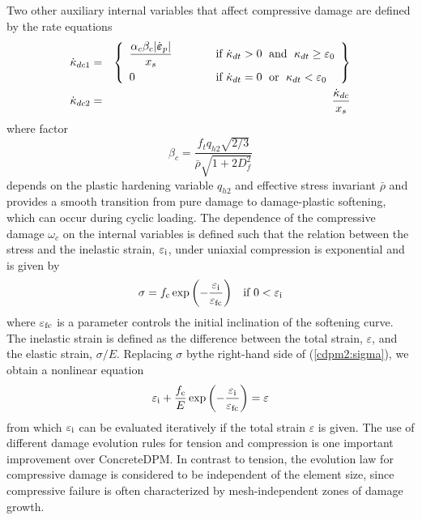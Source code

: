 \documentclass[a4paper]{article}
\begin{document}
Two other auxiliary internal variables that affect compressive damage are defined by the rate equations
\begin{eqnarray}
\dot\kappa_{dc1} &=& \left\{\begin{array}{ll}
\displaystyle\frac{\alpha_c\beta_c\vert\dot{\boldsymbol\varepsilon}_p\vert}{x_s} & \hskip 10mm \mbox{if } \dot\kappa_{dt}>0\;\mbox{ and }\; \kappa_{dt}\ge \varepsilon_0
\\[3mm]
0 & \hskip 10mm \mbox{if } \dot\kappa_{dt}=0\;\mbox{ or }\; \kappa_{dt}< \varepsilon_0
\end{array}\right\}
\\
\dot\kappa_{dc2} &=&  \frac{\dot\kappa_{dc}}{x_s}
\end{eqnarray}
where factor
\begin{equation}\label{cdpm2:betac}
  \beta_c =\frac{f_tq_{h2}\sqrt{2/3}}{\bar\rho\sqrt{1+2D_f^2}}
\end{equation}
depends on the plastic hardening variable $q_{h2}$ and
effective stress invariant $\bar\rho$ and provides a smooth transition 
from pure damage to damage-plastic softening, which can occur during cyclic
loading. The dependence of the compressive damage $\omega_c$ on the internal
variables is defined such that the relation between the stress and the inelastic strain, $\varepsilon_{\rm i}$,
under uniaxial compression is exponential and is given by
\begin{equation}\label{cdpm2:sigma}
\begin{array}{ll}
\sigma = f_{\rm c} \exp\left(-\dfrac{\varepsilon_{\rm i}}{\varepsilon_{\rm fc}}\right) & \mbox{if $0 < \varepsilon_{\rm i}$}
\end{array}
\end{equation}
where $\varepsilon_{\rm fc}$ is a parameter controls the initial inclination of the softening curve.
The inelastic strain is defined as the difference between the total strain, $\varepsilon$, and the elastic strain, $\sigma/E$.
Replacing $\sigma$ bythe right-hand side of (\ref{cdpm2:sigma}), we obtain a nonlinear equation
\begin{equation}\label{cdpm2:epsi}
\begin{array}{ll}
\varepsilon_{\rm i} + \dfrac{f_{\rm c}}{E} \exp\left(-\dfrac{\varepsilon_{\rm i}}{\varepsilon_{\rm fc}}\right) = \varepsilon
\end{array}
\end{equation}
from which $\varepsilon_{\rm i}$ can be evaluated iteratively if the total strain $\varepsilon$ is given.
The use of different damage evolution rules for tension and compression is one important improvement over ConcreteDPM.
In contrast to tension, the evolution law for compressive damage is considered to be independent of the
element size, since compressive failure is often characterized by mesh-independent zones of damage growth.
\end{document}
